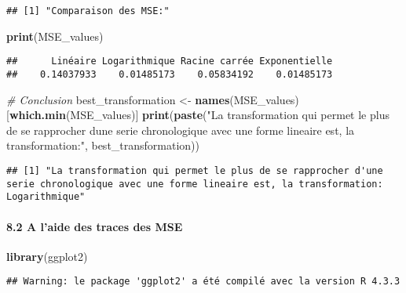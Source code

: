 \documentclass[
]{article}
\newenvironment{Shaded}{\begin{snugshade}}{\end{snugshade}}
\newcommand{\CommentTok}[1]{\textcolor[rgb]{0.56,0.35,0.01}{\textit{#1}}}
\newcommand{\FunctionTok}[1]{\textcolor[rgb]{0.13,0.29,0.53}{\textbf{#1}}}
\newcommand{\NormalTok}[1]{#1}
\newcommand{\OtherTok}[1]{\textcolor[rgb]{0.56,0.35,0.01}{#1}}
\newcommand{\StringTok}[1]{\textcolor[rgb]{0.31,0.60,0.02}{#1}}
\begin{document}
\begin{verbatim}
## [1] "Comparaison des MSE:"
\end{verbatim}

\begin{Shaded}
\begin{Highlighting}[]
\FunctionTok{print}\NormalTok{(MSE\_values)}
\end{Highlighting}
\end{Shaded}

\begin{verbatim}
##      Linéaire Logarithmique Racine carrée Exponentielle 
##    0.14037933    0.01485173    0.05834192    0.01485173
\end{verbatim}

\begin{Shaded}
\begin{Highlighting}[]
\CommentTok{\# Conclusion}
\NormalTok{best\_transformation }\OtherTok{\textless{}{-}} \FunctionTok{names}\NormalTok{(MSE\_values)[}\FunctionTok{which.min}\NormalTok{(MSE\_values)]}
\FunctionTok{print}\NormalTok{(}\FunctionTok{paste}\NormalTok{(}\StringTok{"La transformation qui permet le plus de se rapprocher d\textquotesingle{}une serie chronologique avec une forme lineaire est, la transformation:"}\NormalTok{, best\_transformation))}
\end{Highlighting}
\end{Shaded}

\begin{verbatim}
## [1] "La transformation qui permet le plus de se rapprocher d'une serie chronologique avec une forme lineaire est, la transformation: Logarithmique"
\end{verbatim}

\paragraph{8.2 A l'aide des traces des
MSE}\label{a-laide-des-traces-des-mse}

\begin{Shaded}
\begin{Highlighting}[]
\FunctionTok{library}\NormalTok{(ggplot2)}
\end{Highlighting}
\end{Shaded}

\begin{verbatim}
## Warning: le package 'ggplot2' a été compilé avec la version R 4.3.3
\end{verbatim}
\end{document}
